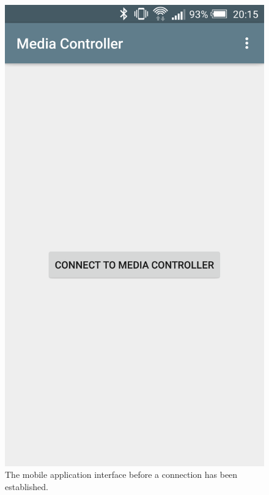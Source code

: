 \documentclass{article}
\begin{document}
			\begin{figure}[]
				\centering
				\begin{minipage}[h]{0.29\textwidth}
					\centering
					\includegraphics[width=\textwidth]{app01}
					\caption{The mobile application interface before a connection has been established.}
					\label{fig:app01}
				\end{minipage}
				\hfill
				\begin{minipage}[h]{0.29\textwidth}
					\centering

\end{minipage}
\end{figure}
\end{document}
